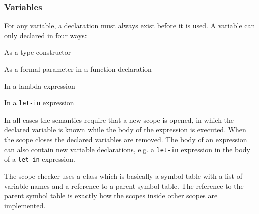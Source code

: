

\subsubsection{Variables}
For any variable, a declaration must always exist before it is used. A variable
can only declared in four ways:

\begin{dlist}
  \item As a type constructor
  \item As a formal parameter in a function declaration
  \item In a lambda expression
  \item In a \texttt{let-in} expression
\end{dlist}

In all cases the \productname{} semantics require that a new scope is opened, in
which the declared variable is known while the body of the expression is
executed. When the scope closes the declared variables are removed. The body of
an expression can also contain new variable declarations, e.g. a \texttt{let-in}
expression in the body of a \texttt{let-in} expression. 

The scope checker uses a  class which is basically a
symbol table with a list of variable names and a reference to a parent symbol
table.  The reference to the parent symbol table is exactly how the scopes
inside other scopes are implemented. 


